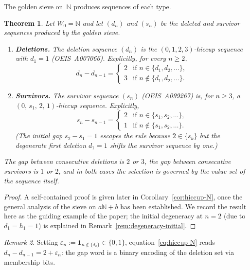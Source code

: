 \documentclass[11pt]{article}
\numberwithin{equation}{section}
\theoremstyle{plain}
\newtheorem{theorem}{Theorem}[section]
\theoremstyle{definition}
\theoremstyle{remark}
\newtheorem{remark}[theorem]{Remark}
\newcommand{\N}{\mathbb{N}}
\begin{document}
The golden sieve on~$\N$ produces sequences of each type.

\begin{theorem}\label{thm:hiccup}
Let $W_0=\N$ and let $(d_n)$ and $(s_n)$ be the deleted and survivor
sequences produced by the golden sieve.
\begin{enumerate}
\item[\textup{(i)}] \textbf{Deletions.}
The deletion sequence $(d_n)$ is the $(0,1,2,3)$-hiccup
sequence with $d_1=1$ \textup{(}OEIS~A007066\textup{)}.  Explicitly,
for every $n\ge2$,
\begin{equation}\label{eq:hiccup-N}
  d_n-d_{n-1}=
  \begin{cases}
    2 & \text{if } n\in\{d_1,d_2,\ldots\},\\
    3 & \text{if } n\notin\{d_1,d_2,\ldots\}.
  \end{cases}
\end{equation}
\item[\textup{(ii)}] \textbf{Survivors.}
The survivor sequence $(s_n)$ \textup{(}OEIS~A099267\textup{)} is,
for $n\ge3$, a $(0,\,s_1,\,2,\,1)$-hiccup sequence.  Explicitly,
\begin{equation}\label{eq:hiccup-N-surv}
  s_n - s_{n-1} =
  \begin{cases}
    2 & \text{if } n\in\{s_1,s_2,\ldots\},\\
    1 & \text{if } n\notin\{s_1,s_2,\ldots\}.
  \end{cases}
\end{equation}
\textup{(}The initial gap $s_2-s_1=1$ escapes the rule because
$2\in\{s_k\}$ but the degenerate first deletion $d_1=1$ shifts the
survivor sequence by one.\textup{)}
\end{enumerate}
The gap between consecutive deletions is $2$ or $3$, the gap between
consecutive survivors is $1$ or $2$, and in both cases the selection
is governed by the value set of the sequence itself.
\end{theorem}

\begin{proof}
A self-contained proof is given later in Corollary~\ref{cor:hiccup-N},
once the general analysis of the sieve on $a\N+b$ has been established.
We record the result here as the guiding example of the paper; the initial
degeneracy at $n=2$ (due to $d_1=h_1=1$) is explained in
Remark~\ref{rem:degeneracy-initial}.
\end{proof}

\begin{remark}\label{rem:hiccup-binary}
Setting $\varepsilon_n:=\mathbf{1}_{n\notin\{d_k\}}\in\{0,1\}$,
equation~\eqref{eq:hiccup-N} reads $d_n-d_{n-1}=2+\varepsilon_n$:
the gap word is a binary encoding of the deletion set via membership bits.
\end{remark}
\end{document}

